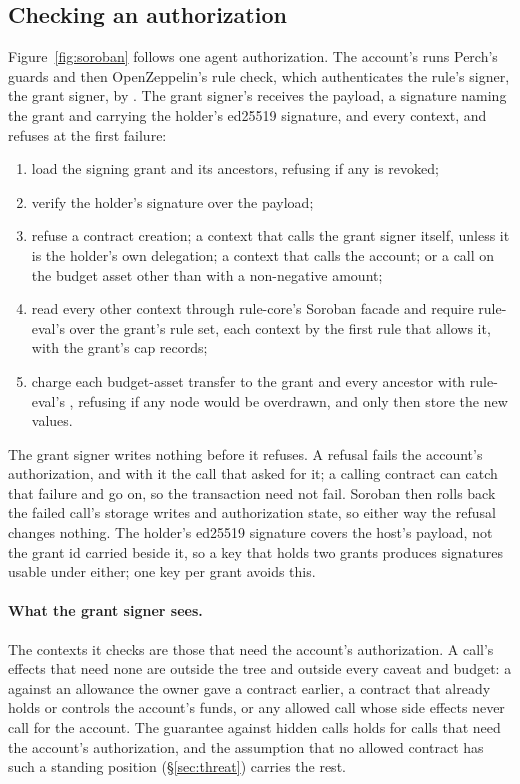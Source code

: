 \subsection{Checking an authorization}

Figure~\ref{fig:soroban} follows one agent authorization. The account's
 runs Perch's guards and then OpenZeppelin's rule
check, which authenticates the rule's signer, the grant signer, by
. The grant signer's 
receives the payload, a signature naming the grant and carrying the holder's
ed25519 signature, and every context, and refuses at the first failure:
\begin{enumerate}
\item load the signing grant and its ancestors, refusing if any is revoked;
\item verify the holder's signature over the payload;
\item refuse a contract creation; a context that calls the grant signer
  itself, unless it is the holder's own delegation; a context that calls the
  account; or a call on the budget asset other than  with a
  non-negative amount;
\item read every other context through rule-core's Soroban facade and
  require rule-eval's  over the grant's rule set, each
  context by the first rule that allows it, with the grant's cap records;
\item charge each budget-asset transfer to the grant and every ancestor with
  rule-eval's , refusing if any node would be overdrawn, and only then
  store the new  values.
\end{enumerate}
The grant signer writes nothing before it refuses. A refusal fails the
account's authorization, and with it the call that asked for it; a calling
contract can catch that failure and go on, so the transaction need not fail.
Soroban then rolls back the failed call's storage writes and authorization
state, so either way the refusal changes nothing. The holder's ed25519 signature covers the host's payload,
not the grant id carried beside it, so a key that holds two grants produces
signatures usable under either; one key per grant avoids this.

\paragraph{What the grant signer sees.} The contexts it checks are those that
need the account's authorization. A call's effects that need none are outside
the tree and outside every caveat and budget: a  against
an allowance the owner gave a contract earlier, a contract that already holds
or controls the account's funds, or any allowed call whose side effects never
call  for the account. The guarantee against hidden calls
holds for calls that need the account's authorization, and the assumption that
no allowed contract has such a standing position (\S\ref{sec:threat}) carries
the rest.

